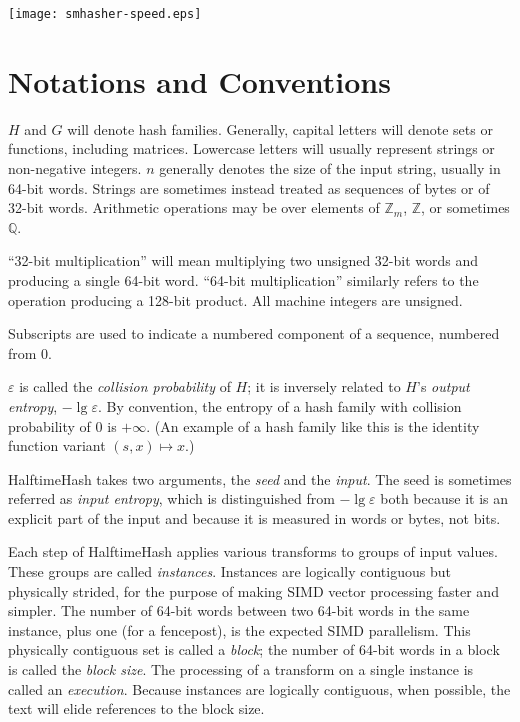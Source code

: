 \documentclass[sigconf, nonacm]{acmart}
\newcommand{\rats}{\mathbb{Q}}
\newcommand{\ints}{\mathbb{Z}}
\begin{document}
\texttt{[image: smhasher-speed.eps]}



\section{Notations and Conventions}

$H$ and $G$ will denote hash families.
Generally, capital letters will denote sets or functions, including matrices.
Lowercase letters will usually represent strings or non-negative integers.
$n$ generally denotes the size of the input string, usually in 64-bit words.
Strings are sometimes instead treated as sequences of bytes or of 32-bit words.
Arithmetic operations may be over elements of $\ints_m$, $\ints$, or sometimes $\rats$.

``32-bit multiplication'' will mean multiplying two unsigned 32-bit words and producing a single 64-bit word.
``64-bit multiplication'' similarly refers to the operation producing a 128-bit product.
All machine integers are unsigned.

Subscripts are used to indicate a numbered component of a sequence, numbered from 0.

$\varepsilon$ is called the {\em collision probability} of $H$; it is inversely related to $H$'s {\em output entropy}, $-\lg \varepsilon$.
By convention, the entropy of a hash family with collision probability of $0$ is $+\infty$.
(An example of a hash family like this is the identity function variant $(s, x) \mapsto x$.)

HalftimeHash takes two arguments, the {\em seed} and the {\em input}.
The seed is sometimes referred as {\em input entropy}, which is distinguished from $-\lg \varepsilon$ both because it is an explicit part of the input and because it is measured in words or bytes, not bits.

Each step of HalftimeHash applies various transforms to groups of input values.
These groups are called {\em instances}.
Instances are logically contiguous but physically strided, for the purpose of making SIMD vector processing faster and simpler.
The number of 64-bit words between two 64-bit words in the same instance, plus one (for a fencepost), is the expected SIMD parallelism.
This physically contiguous set is called a {\em block}; the number of 64-bit words in a block is called the {\em block size}.
The processing of a transform on a single instance is called an {\em execution}.
Because instances are logically contiguous, when possible, the text will elide references to the block size.
\end{document}
